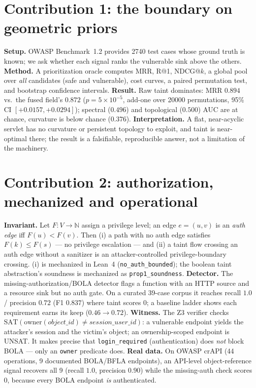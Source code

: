 \documentclass[11pt]{article}
\newcommand{\N}{\mathbb{N}}
\begin{document}
\section{Contribution 1: the boundary on geometric priors}
\textbf{Setup.} OWASP Benchmark~1.2 provides 2740 test cases whose ground truth is
known; we ask whether each signal ranks the vulnerable sink above the others.
\textbf{Method.} A prioritization oracle computes MRR, R@1, NDCG@$k$, a global
pool over \emph{all} candidates (safe and vulnerable), cost curves, a paired
permutation test, and bootstrap confidence intervals.
\textbf{Result.} Raw taint dominates: MRR $0.894$ vs.\ the fused field's $0.872$
($p=5\times10^{-5}$, add-one over 20000 permutations, 95\% CI $[+0.0157,+0.0294]$);
spectral ($0.496$) and topological ($0.500$) AUC are at chance, curvature is below
chance ($0.376$). \textbf{Interpretation.} A flat, near-acyclic servlet has no
curvature or persistent topology to exploit, and taint is near-optimal there; the
result is a falsifiable, reproducible answer, not a limitation of the machinery.

\section{Contribution 2: authorization, mechanized and operational}
\textbf{Invariant.} Let $F:V\to\N$ assign a privilege level; an edge $e=(u,v)$ is
an \emph{auth edge} iff $F(u)<F(v)$. Then (i) a path with no auth edge satisfies
$F(k)\le F(s)$ --- no privilege escalation --- and (ii) a taint flow crossing an
auth edge without a sanitizer is an attacker-controlled privilege-boundary
crossing. (i) is mechanized in Lean~4 (\texttt{no\_auth\_bounded}); the boolean
taint abstraction's soundness is mechanized as \texttt{prop1\_soundness}.
\textbf{Detector.} The missing-authorization/BOLA detector flags a function with
an HTTP source and a resource sink but no auth gate. On a curated 39-case corpus
it reaches recall $1.0$ / precision $0.72$ (F1 $0.837$) where taint scores $0$; a
baseline ladder shows each requirement earns its keep ($0.46\to0.72$).
\textbf{Witness.} The Z3 verifier checks
$\mathrm{SAT}(\mathrm{owner}(object\_id)\neq session\_user\_id)$: a vulnerable
endpoint yields the attacker's session and the victim's object; an
ownership-scoped endpoint is UNSAT. It makes precise that \texttt{login\_required}
(authentication) does \emph{not} block BOLA --- only an \texttt{owner} predicate
does. \textbf{Real data.} On OWASP crAPI (44 operations, 9 documented BOLA/BFLA
endpoints), an API-level object-reference signal recovers all 9 (recall $1.0$,
precision $0.90$) while the missing-auth check scores $0$, because every BOLA
endpoint \emph{is} authenticated.
\end{document}
